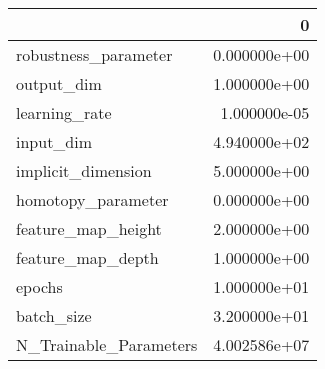 \begin{tabular}{lr}
\toprule
{} &             0 \\
\midrule
robustness\_parameter   &  0.000000e+00 \\
output\_dim             &  1.000000e+00 \\
learning\_rate          &  1.000000e-05 \\
input\_dim              &  4.940000e+02 \\
implicit\_dimension     &  5.000000e+00 \\
homotopy\_parameter     &  0.000000e+00 \\
feature\_map\_height     &  2.000000e+00 \\
feature\_map\_depth      &  1.000000e+00 \\
epochs                 &  1.000000e+01 \\
batch\_size             &  3.200000e+01 \\
N\_Trainable\_Parameters &  4.002586e+07 \\
\bottomrule
\end{tabular}
